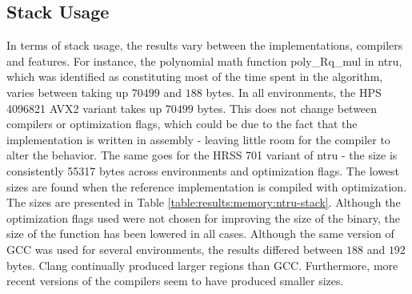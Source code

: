 \subsection{Stack Usage}

In terms of stack usage, the results vary between the implementations, compilers and features. For instance, the polynomial math function poly\_Rq\_mul in \gls{ntru}, which was identified as constituting most of the time spent in the algorithm, varies between taking up $70499$ and $188$ bytes. In all environments, the HPS 4096821 AVX2 variant takes up $70499$ bytes. This does not change between compilers or optimization flags, which could be due to the fact that the implementation is written in assembly - leaving little room for the compiler to alter the behavior. The same goes for the HRSS 701 variant of \gls{ntru} - the size is consistently 55317 bytes across environments and optimization flags. The lowest sizes are found when the reference implementation is compiled with optimization. The sizes are presented in Table \ref{table:results:memory:ntru-stack}. Although the optimization flags used were not chosen for improving the size of the binary, the size of the function has been lowered in all cases. Although the same version of GCC was used for several environments, the results differed between $188$ and $192$ bytes. Clang continually produced larger regions than GCC. Furthermore, more recent versions of the compilers seem to have produced smaller sizes.

